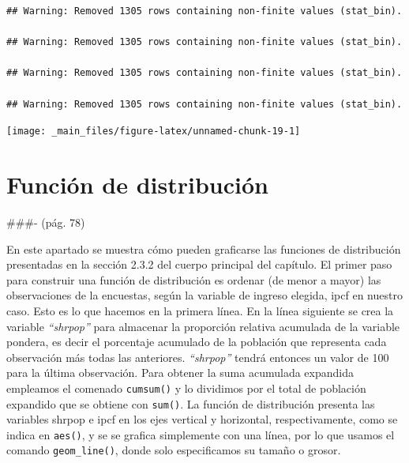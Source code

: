 \documentclass[
]{book}
\begin{document}
\begin{verbatim}
## Warning: Removed 1305 rows containing non-finite values (stat_bin).

## Warning: Removed 1305 rows containing non-finite values (stat_bin).

## Warning: Removed 1305 rows containing non-finite values (stat_bin).

## Warning: Removed 1305 rows containing non-finite values (stat_bin).
\end{verbatim}

\texttt{[image: \_main\_files/figure-latex/unnamed-chunk-19-1]}

\hypertarget{funciuxf3n-de-distribuciuxf3n}{%
\section{Función de distribución}\label{funciuxf3n-de-distribuciuxf3n}}

\#\#\#- (pág. 78)

En este apartado se muestra cómo pueden graficarse las funciones de distribución presentadas en la sección 2.3.2 del cuerpo principal del capítulo. El primer paso para construir una función de distribución es ordenar (de menor a mayor) las observaciones de la encuestas, según la variable de ingreso elegida, ipcf en nuestro caso. Esto es lo que hacemos en la primera línea. En la línea siguiente se crea la variable \emph{``shrpop''} para almacenar la proporción relativa acumulada de la variable pondera, es decir el porcentaje acumulado de la población que representa cada observación más todas las anteriores. \emph{``shrpop''} tendrá entonces un valor de 100 para la última observación. Para obtener la suma acumulada expandida empleamos el comenado \texttt{cumsum()} y lo dividimos por el total de población expandido que se obtiene con \texttt{sum()}. La función de distribución presenta las variables shrpop e ipcf en los ejes vertical y horizontal, respectivamente, como se indica en \texttt{aes()}, y se se grafica simplemente con una línea, por lo que usamos el comando \texttt{geom\_line()}, donde solo especificamos su tamaño o grosor.
\end{document}
